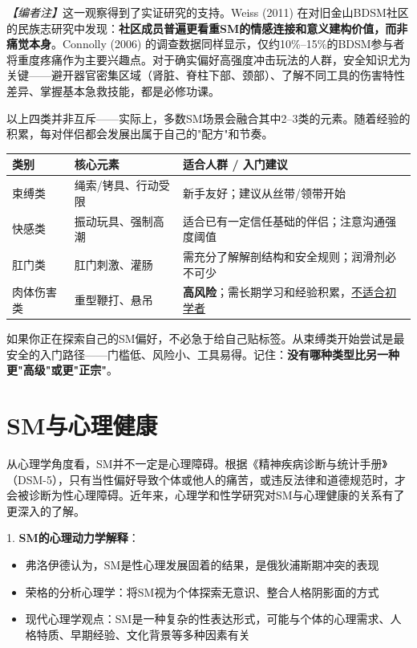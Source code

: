 \documentclass[12pt,UTF8]{ctexbook}
\begin{document}
\textit{【编者注】}这一观察得到了实证研究的支持。Weiss (2011) 在对旧金山BDSM社区的民族志研究中发现：\textbf{社区成员普遍更看重SM的情感连接和意义建构价值，而非痛觉本身}。Connolly (2006) 的调查数据同样显示，仅约10\%--15\%的BDSM参与者将重度疼痛作为主要兴趣点。对于确实偏好高强度冲击玩法的人群，安全知识尤为关键——避开器官密集区域（肾脏、脊柱下部、颈部）、了解不同工具的伤害特性差异、掌握基本急救技能，都是必修功课。

\noindent 以上四类并非互斥——实际上，多数SM场景会融合其中2--3类的元素。随着经验的积累，每对伴侣都会发展出属于自己的"配方"和节奏。

\begin{center}
\begin{tabular}{|p{2.8cm}|p{4cm}|p{5.8cm}|}
\hline
\textbf{类别} & \textbf{核心元素} & \textbf{适合人群 / 入门建议} \\
\hline
束缚类 & 绳索/铐具、行动受限 & 新手友好；建议从丝带/领带开始 \\
\hline
快感类 & 振动玩具、强制高潮 & 适合已有一定信任基础的伴侣；注意沟通强度阈值 \\
\hline
肛门类 & 肛门刺激、灌肠 & 需充分了解解剖结构和安全规则；润滑剂必不可少 \\
\hline
肉体伤害类 & 重型鞭打、悬吊 & \textbf{高风险}；需长期学习和经验积累，\underline{不适合初学者} \\
\hline
\end{tabular}
\end{center}

\begin{tcolorbox}[colback=pink!5!white,colframe=red!50!black,title=贴心小叮咛]
如果你正在探索自己的SM偏好，不必急于给自己贴标签。从束缚类开始尝试是最安全的入门路径——门槛低、风险小、工具易得。记住：\textbf{没有哪种类型比另一种更"高级"或更"正宗"}。
\end{tcolorbox}

\section{SM与心理健康}

从心理学角度看，SM并不一定是心理障碍。根据《精神疾病诊断与统计手册》（DSM-5），只有当性偏好导致个体或他人的痛苦，或违反法律和道德规范时，才会被诊断为性心理障碍。近年来，心理学和性学研究对SM与心理健康的关系有了更深入的了解。

1. \textbf{SM的心理动力学解释}：
  \begin{itemize}
  \item 弗洛伊德认为，SM是性心理发展固着的结果，是俄狄浦斯期冲突的表现
  \item 荣格的分析心理学：将SM视为个体探索无意识、整合人格阴影面的方式
  \item 现代心理学观点：SM是一种复杂的性表达形式，可能与个体的心理需求、人格特质、早期经验、文化背景等多种因素有关
  \end{itemize}
\end{document}
